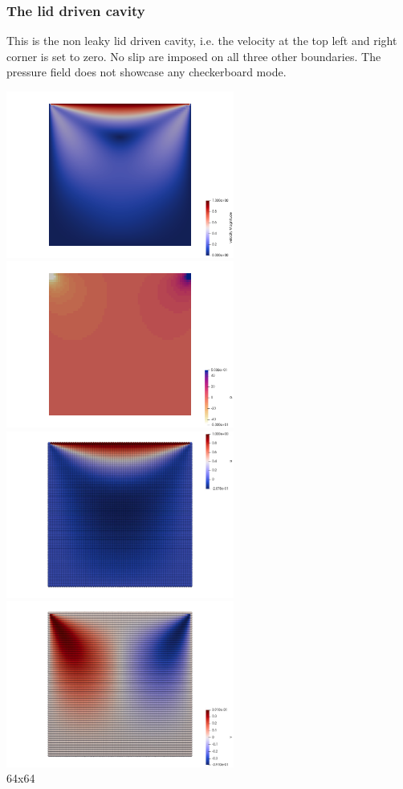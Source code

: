 \subsubsection*{The lid driven cavity}

This is the non leaky lid driven cavity, i.e. the velocity at the top left and right corner 
is set to zero. No slip are imposed on all three other boundaries. 
The pressure field does not showcase any checkerboard mode. 

\begin{center}
\includegraphics[width=7.5cm]{python_codes/fieldstone_80/results/ldc/vel}
\includegraphics[width=7.5cm]{python_codes/fieldstone_80/results/ldc/p}
\includegraphics[width=7.5cm]{python_codes/fieldstone_80/results/ldc/u_dofs}
\includegraphics[width=7.5cm]{python_codes/fieldstone_80/results/ldc/v_dofs}\\
{\captionfont 64x64}
\end{center}

